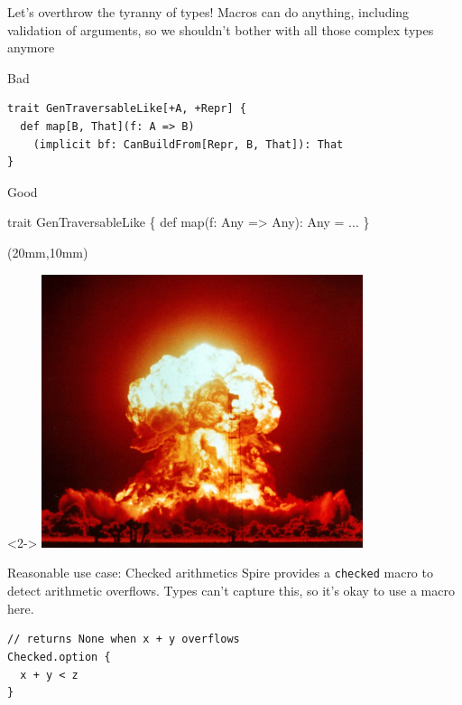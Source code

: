 \documentclass{beamer}
\begin{document}
\begin{frame}[fragile]{Let's overthrow the tyranny of types!}
  Macros can do anything, including validation of arguments,
  so we shouldn't bother with all those complex types anymore

  \vspace{1em}
  \begin{alertblock}{Bad}
    \begin{verbatim}
trait GenTraversableLike[+A, +Repr] {
  def map[B, That](f: A => B)
    (implicit bf: CanBuildFrom[Repr, B, That]): That
}
    \end{verbatim}
  \end{alertblock}

  \begin{exampleblock}{Good}
    \begin{semiverbatim}
trait GenTraversableLike \{
  def map(f: Any => Any): Any = \text{\color{blue}{macro}} ...
\}
    \end{semiverbatim}
  \end{exampleblock}

  \begin{textblock*}{\textwidth}(20mm,10mm)
    \begin{visibleenv}<2->
      \includegraphics[height=8cm]{img/boom.jpg}
    \end{visibleenv}
  \end{textblock*}
\end{frame}

\begin{frame}[fragile]{Reasonable use case: Checked arithmetics}
  Spire provides a \texttt{checked} macro to detect arithmetic overflows.
  Types can't capture this, so it's okay to use a macro here.

  \vspace{1em}
  \begin{verbatim}
// returns None when x + y overflows
Checked.option {
  x + y < z
}
  \end{verbatim}
\end{frame}
\end{document}
